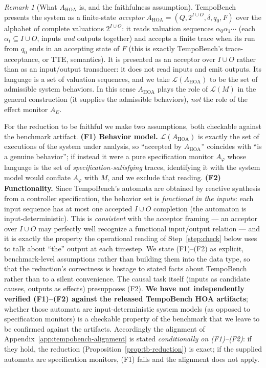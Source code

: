 \documentclass[11pt]{article}
\theoremstyle{remark}
\newtheorem{remark}{Remark}
\newcommand{\Lang}{\mathcal{L}}
\begin{document}
\begin{remark}[What \(A_{\mathrm{HOA}}\) is, and the faithfulness assumption]
\label{rem:hoa}
TempoBench presents the system as a finite-state \emph{acceptor}
\(A_{\mathrm{HOA}}=(Q,2^{I\cup O},\delta,q_0,F)\) over the alphabet of complete
valuations \(2^{I\cup O}\): it reads valuation sequences
\(\alpha_0\alpha_1\cdots\) (each \(\alpha_t\subseteq I\cup O\), inputs \emph{and}
outputs together) and accepts a finite trace when its run from \(q_0\) ends in an
accepting state of \(F\) (this is exactly TempoBench's trace-acceptance, or TTE,
semantics). It is presented as an acceptor over \(I\cup O\) rather than as an
input/output transducer: it does not read inputs and emit outputs. Its language
is a set of valuation sequences, and we take \(\Lang(A_{\mathrm{HOA}})\) to be the
set of admissible system behaviors. In this sense \(A_{\mathrm{HOA}}\) plays the
role of \(\Lang(M)\) in the general construction (it supplies the admissible
behaviors), \emph{not} the role of the effect monitor \(A_E\).

For the reduction to be faithful we make two assumptions, both checkable against
the benchmark artifact. \textbf{(F1) Behavior model.}
\(\Lang(A_{\mathrm{HOA}})\) is exactly the set of executions of the system under
analysis, so ``accepted by \(A_{\mathrm{HOA}}\)'' coincides with ``is a genuine
behavior''; if instead it were a pure specification monitor \(A_\varphi\) whose
language is the set of \emph{specification-satisfying} traces, identifying it with
the system model would conflate \(A_\varphi\) with \(M\), and we exclude that
reading. \textbf{(F2) Functionality.} Since TempoBench's automata are obtained by
reactive synthesis from a controller specification, the behavior set is
\emph{functional in the inputs}: each input sequence has at most one accepted
\(I\cup O\) completion (the automaton is input-deterministic). This is
\emph{consistent} with the acceptor framing --- an acceptor over \(I\cup O\) may
perfectly well recognize a functional input/output relation --- and it is exactly
the property the operational reading of Step~\ref{step:check} below uses to talk
about ``the'' output at each timestep. We state (F1)--(F2) as explicit,
benchmark-level assumptions rather than building them into the data type, so that
the reduction's correctness is hostage to stated facts about TempoBench rather
than to a silent convenience. The causal task itself (inputs as candidate causes,
outputs as effects) presupposes (F2). \textbf{We have not independently verified
(F1)--(F2) against the released TempoBench HOA artifacts}; whether those automata
are input-deterministic system models (as opposed to specification monitors) is a
checkable property of the benchmark that we leave to be confirmed against the
artifacts. Accordingly the alignment of Appendix~\ref{app:tempobench-alignment} is
stated \emph{conditionally on (F1)--(F2)}: if they hold, the reduction
(Proposition~\ref{prop:tb-reduction}) is exact; if the supplied automata are
specification monitors, (F1) fails and the alignment does not apply.
\end{remark}
\end{document}
